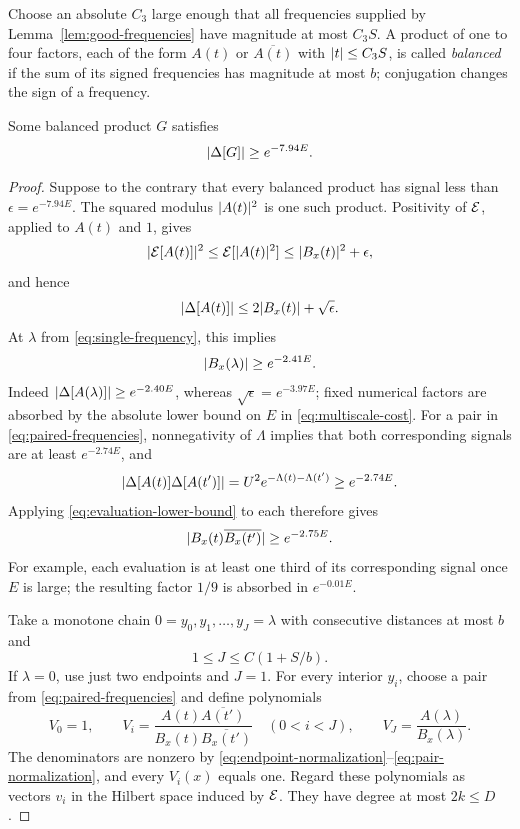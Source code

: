 Choose an absolute $C_3$ large enough that all frequencies supplied by
Lemma~\ref{lem:good-frequencies} have magnitude at most $C_3S$.
A product of one to four factors, each of the form $A(t)$ or
$\overline{A(t)}$ with $\lvert t\rvert\le C_3S$, is called \emph{balanced} if the
sum of its signed frequencies has magnitude at most $b$; conjugation changes
the sign of a frequency.

\begin{lemma}\label{lem:balanced-product}
Some balanced product $G$ satisfies
\begin{equation}\label{eq:balanced-product-signal}
 \lvert \Delta[G]\rvert\ge e^{-7.94E}.
\end{equation}
\end{lemma}

\begin{proof}
Suppose to the contrary that every balanced product has signal less than
$\epsilon=e^{-7.94E}$.  The squared modulus $\lvert A(t)\rvert^2$ is one such
product.  Positivity of $\mathcal E$, applied to $A(t)$ and $1$, gives
\[
 \lvert \mathcal E[A(t)]\rvert^2\le\mathcal E[\lvert A(t)\rvert^2]
 \le\lvert B_x(t)\rvert^2+\epsilon,
\]
and hence
\begin{equation}\label{eq:evaluation-lower-bound}
 \lvert \Delta[A(t)]\rvert\le2\lvert B_x(t)\rvert+\sqrt\epsilon.
\end{equation}
At $\lambda$ from \eqref{eq:single-frequency}, this implies
\begin{equation}\label{eq:endpoint-normalization}
 \lvert B_x(\lambda)\rvert\ge e^{-2.41E}.
\end{equation}
Indeed $\lvert \Delta[A(\lambda)]\rvert\ge e^{-2.40E}$, whereas
$\sqrt\epsilon=e^{-3.97E}$; fixed numerical factors are absorbed by the
absolute lower bound on $E$ in \eqref{eq:multiscale-cost}.
For a pair in \eqref{eq:paired-frequencies}, nonnegativity of $\Lambda$
implies that both corresponding signals are at least $e^{-2.74E}$, and
\[
 \lvert \Delta[A(t)]\Delta[A(t')]\rvert
 =U^2e^{-\Lambda(t)-\Lambda(t')}\ge e^{-2.74E}.
\]
Applying
\eqref{eq:evaluation-lower-bound} to each therefore gives
\begin{equation}\label{eq:pair-normalization}
 \lvert B_x(t)\overline{B_x(t')}\rvert\ge e^{-2.75E}.
\end{equation}
For example, each evaluation is at least one third of its corresponding
signal once $E$ is large; the resulting factor $1/9$ is absorbed in $e^{-0.01E}$.

Take a monotone chain
$0=y_0,y_1,\ldots,y_J=\lambda$ with consecutive distances at most $b$ and
\[
 1\le J\le C(1+S/b).
\]
If $\lambda=0$, use just two endpoints and $J=1$.
For every interior $y_i$, choose a pair from
\eqref{eq:paired-frequencies} and define polynomials
\[
 V_0=1,\qquad
 V_i=\frac{A(t)\overline{A(t')}}{B_x(t)\overline{B_x(t')}}\quad(0<i<J),
 \qquad V_J=\frac{A(\lambda)}{B_x(\lambda)}.
\]
The denominators are nonzero by
\eqref{eq:endpoint-normalization}--\eqref{eq:pair-normalization}, and every
$V_i(x)$ equals one.  Regard these polynomials as vectors $v_i$ in the
Hilbert space induced by $\mathcal E$.  They have degree at most $2k\le D$.


\end{proof}

